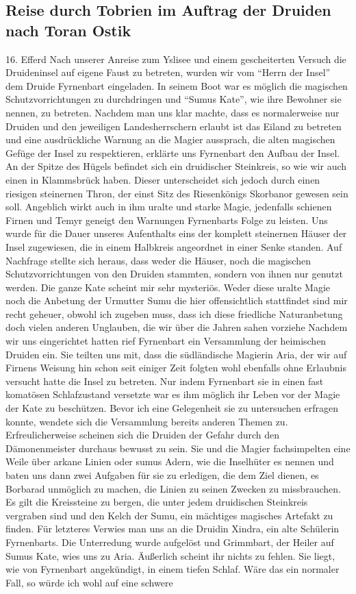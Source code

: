 \subsection{Reise durch Tobrien im Auftrag der Druiden nach Toran Ostik}
16. Efferd
Nach unserer Anreise zum Yslisee und einem gescheiterten Versuch die Druideninsel auf eigene Faust zu betreten, wurden wir vom ``Herrn der Insel'' dem Druide Fyrnenbart eingeladen. In seinem Boot war es möglich die magischen Schutzvorrichtungen zu durchdringen und ``Sumus Kate'', wie ihre Bewohner sie nennen, zu betreten. Nachdem man uns klar machte, dass es normalerweise nur Druiden und den jeweiligen Landesherrschern erlaubt ist das Eiland zu betreten und eine ausdrückliche Warnung an die Magier aussprach, die alten magischen Gefüge der Insel zu respektieren, erklärte uns Fyrnenbart den Aufbau der Insel. An der Spitze des Hügels befindet sich ein druidischer Steinkreis, so wie wir auch einen in Klammsbrück haben. Dieser unterscheidet sich jedoch durch einen riesigen steinernen Thron, der einst Sitz des Riesenkönigs Skorbanor gewesen sein soll. Angeblich wirkt auch in ihm uralte und starke Magie, jedenfalls schienen Firnen und Temyr geneigt den Warnungen Fyrnenbarts Folge zu leisten. Uns wurde für die Dauer unseres Aufenthalts eins der komplett steinernen Häuser der Insel zugewiesen, die in einem Halbkreis angeordnet in einer Senke standen. Auf Nachfrage stellte sich heraus, dass weder die Häuser, noch die magischen Schutzvorrichtungen von den Druiden stammten, sondern von ihnen nur genutzt werden. Die ganze Kate scheint mir sehr mysteriös. Weder diese uralte Magie noch die Anbetung der Urmutter Sumu die hier offensichtlich stattfindet sind mir recht geheuer, obwohl ich zugeben muss, dass ich diese friedliche Naturanbetung doch vielen anderen Unglauben, die wir über die Jahren sahen vorziehe Nachdem wir uns eingerichtet hatten rief Fyrnenbart ein Versammlung der heimischen Druiden ein. Sie teilten uns mit, dass die südländische Magierin Aria, der wir auf Firnens Weisung hin schon seit einiger Zeit folgten wohl ebenfalls ohne Erlaubnis versucht hatte die Insel zu betreten. Nur indem Fyrnenbart sie in einen fast komatösen Schlafzustand versetzte war es ihm möglich ihr Leben vor der Magie der Kate zu beschützen. Bevor ich eine Gelegenheit sie zu untersuchen erfragen konnte, wendete sich die Versammlung bereits anderen Themen zu. Erfreulicherweise scheinen sich die Druiden der Gefahr durch den Dämonenmeister durchaus bewusst zu sein. Sie und die Magier fachsimpelten eine Weile über arkane Linien oder sumus Adern, wie die Inselhüter es nennen und baten uns dann zwei Aufgaben für sie zu erledigen, die dem Ziel dienen, es Borbarad unmöglich zu machen, die Linien zu seinen Zwecken zu missbrauchen. Es gilt die Kreissteine zu bergen, die unter jedem druidischen Steinkreis vergraben sind und den Kelch der Sumu, ein mächtiges magisches Artefakt zu finden. Für letzteres Verwies man uns an die Druidin Xindra, ein alte Schülerin Fyrnenbarts. Die Unterredung wurde aufgelöst und Grimmbart, der Heiler auf Sumus Kate, wies uns zu Aria. Äußerlich scheint ihr nichts zu fehlen. Sie liegt, wie von Fyrnenbart angekündigt, in einem tiefen Schlaf. Wäre das ein normaler Fall, so würde ich wohl auf eine schwere 